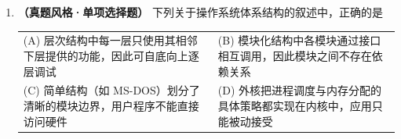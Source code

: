 \begin{enumerate}[resume]
假设系统在中断处理结束后立即调度 A 运行，且进程切换本身在内核态内部完成、不额外产生用户态与内核态之间的切换。

（1）按发生顺序排列上述事件。
（2）从 A 发起 \texttt{read} 到 A 收到返回值，A 自身经历了几次「用户态$\to$内核态」、几次「内核态$\to$用户态」？整个系统（含中断）共几次？
（3）为什么 A 不能直接调用内核中的 \texttt{read} 服务例程，而必须通过系统调用？

\ifshowsolutions\par\noindent\textbf{解析：}
（1）顺序为 \textcircled{1}$\to$\textcircled{2}$\to$\textcircled{3}$\to$\textcircled{4}$\to$\textcircled{5}$\to$\textcircled{6}。先是由用户态陷入内核（\textcircled{1}），再在内核中定位服务例程（\textcircled{2}）；参数合法但数据不在内存，于是发起磁盘读并让出 CPU（\textcircled{3}）；磁盘完成后由中断驱动后续工作（\textcircled{4}）；中断服务程序完成数据传送并唤醒 A（\textcircled{5}）；A 再次被调度时，内核替它完成系统调用的返回（\textcircled{6}）。

（2）计数口径要分清「A 自身」和「整个系统」。
对 A 自身：只在 \textcircled{1} 发生一次用户态$\to$内核态（陷入），只在 \textcircled{6} 发生一次内核态$\to$用户态（系统调用返回），共 $2$ 次。
对整个系统：用户态$\to$内核态共 $2$ 次——\textcircled{1} 的陷入，以及 \textcircled{4} 的磁盘中断（当时运行的 B 从用户态进入内核）；内核态$\to$用户态也共 $2$ 次——\textcircled{3} 调度 B 之后内核必须返回 B 的用户态，\textcircled{6} 返回 A 的用户态。合计 $4$ 次。注意 \textcircled{5} 在中断处理内部完成，本身不产生态切换；\textcircled{3} 的进程切换在内核态内部完成，也不额外产生「用户态/内核态」的切换——切换的是进程，不是特权级。

（3）内核的代码与数据位于内核地址空间，页表/段表中这些页被标记为仅内核可访问（如 x86 页表项的 U/S 位），CPU 在用户态处于低特权级，访问它们会触发保护性异常，而不会执行内核代码；修改页表基址寄存器、开关中断等特权指令在用户态同样非法。因此用户程序无法用普通 \texttt{call} 进入内核。系统调用提供唯一的受控入口：用体系结构规定的陷入指令把控制权交给内核中预先注册的入口，用系统调用号选择具体服务，内核在服务前还会检查参数（如用户缓冲区指针是否落在该进程的用户空间内），既完成服务又不破坏隔离。\else \answerarea[10] \fi

\vspace{8pt}

\item \textbf{（真题风格·单项选择题）} 下列关于操作系统体系结构的叙述中，正确的是
\begin{center}
\begin{tabularx}{\linewidth}{@{}XX@{}}
(A) 层次结构中每一层只使用其相邻下层提供的功能，因此可自底向上逐层调试 & (B) 模块化结构中各模块通过接口相互调用，因此模块之间不存在依赖关系 \\[4pt]
(C) 简单结构（如 MS-DOS）划分了清晰的模块边界，用户程序不能直接访问硬件 & (D) 外核把进程调度与内存分配的具体策略都实现在内核中，应用只能被动接受
\end{tabularx}
\end{center}


\end{enumerate}
